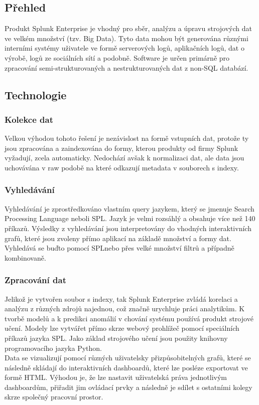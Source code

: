 \documentclass[czech,BP]{thesiskiv}
\begin{document}
\subsection{Přehled}
Produkt Splunk Enterprise je vhodný pro sběr, analýzu a úpravu strojových dat ve velkém množství (tzv. Big Data). Tyto data mohou být generována různými interními systémy uživatele ve formě serverových logů, aplikačních logů, dat o výrobě, logů ze sociálních sítí a podobně. Software je určen primárně pro zpracování semi-strukturovaných a nestrukturovaných dat z non-SQL databází.
\subsection{Technologie}
\subsubsection{Kolekce dat}
Velkou výhodou tohoto řešení je nezávislost na formě vstupních dat, protože ty jsou zpracována a zaindexována do formy, kterou produkty od firmy Splunk vyžadují, zcela automaticky. Nedochází avšak k normalizaci dat, ale data jsou uchovávána v raw podobě na které odkazují metadata v souborech s indexy.
\subsubsection{Vyhledávání}
Vyhledávání je zprostředkováno vlastním query jazykem, který se jmenuje Search Processing Language neboli SPL\texttrademark. Jazyk je velmi rozsáhlý a obsahuje více než 140 příkazů. Výsledky z vyhledávání jsou interpretovány do vhodných interaktivních grafů, které jsou zvoleny přímo aplikací na základě množství a formy dat. Vyhledává se buďto pomocí SPL\texttrademark nebo přes velké množství filtrů a případně kombinovaně. \cite{Operational_intelligence}
\subsubsection{Zpracování dat}
Jelikož je vytvořen soubor s indexy, tak Splunk Enterprise zvládá korelaci a analýzu z různých zdrojů najednou, což značně urychluje práci analytikům. K tvorbě modelů a k predikci anomálií v chování systému používá produkt strojové učení. Modely lze vytvářet přímo skrze webový prohlížeč pomocí speciálních příkazů jazyka SPL\texttrademark. Jako základ strojového učení jsou použity knihovny programovacího jazyka Python. \cite{MachineLearning}
\\
Data se vizualizují pomocí různých uživatelsky přizpůsobitelných grafů, které se následně skládají do interaktivních dashboardů, které lze posléze exportovat ve formě HTML. Výhodou je, že lze nastavit uživatelská práva jednotlivým dashboardům, přiřadit jim ovládací prvky a následně je sdílet s ostatními kolegy skrze společný pracovní prostor.
\end{document}
